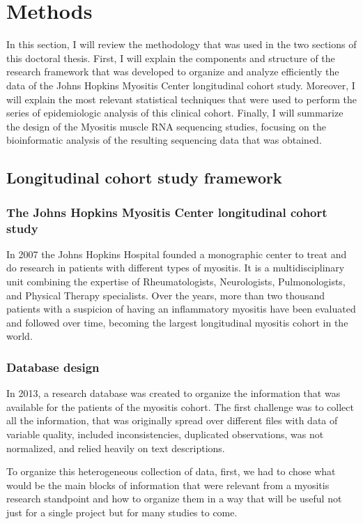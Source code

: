 \chapter{Methods}
In this section, I will review the methodology that was used in the two sections of this doctoral thesis. First, I will explain the components and structure of the research framework that was developed to organize and analyze efficiently the data of the Johns Hopkins Myositis Center longitudinal cohort study. Moreover, I will explain the most relevant statistical techniques that were used to perform the series of epidemiologic analysis of this clinical cohort. Finally, I will summarize the design of the Myositis muscle RNA sequencing studies, focusing on the bioinformatic analysis of the resulting sequencing data that was obtained.

\section{Longitudinal cohort study framework}

\subsection{The Johns Hopkins Myositis Center longitudinal cohort study}
In 2007 the Johns Hopkins Hospital founded a monographic center to treat and do research in patients with different types of myositis. It is a multidisciplinary unit combining the expertise of Rheumatologists, Neurologists, Pulmonologists, and Physical Therapy specialists. Over the years, more than two thousand patients with a suspicion of having an inflammatory myositis have been evaluated and followed over time, becoming the largest longitudinal myositis cohort in the world.

\subsection{Database design}

In 2013, a research database was created to organize the information that was available for the patients of the myositis cohort. The first challenge was to collect all the information, that was originally spread over different files with data of variable quality, included inconsistencies, duplicated observations, was not normalized, and relied heavily on text descriptions.

To organize this heterogeneous collection of data, first, we had to chose what would be the main blocks of information that were relevant from a myositis research standpoint and how to organize them in a way that will be useful not just for a single project but for many studies to come.

